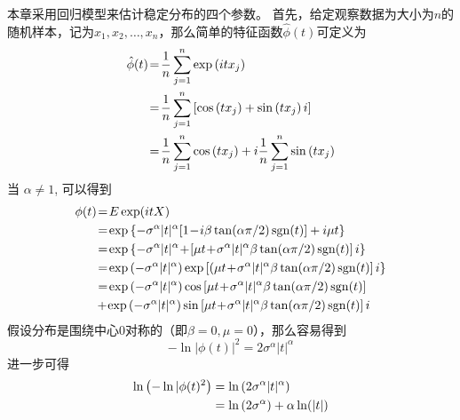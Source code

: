 本章采用回归模型来估计稳定分布的四个参数。
首先，给定观察数据为大小为$n$的随机样本，记为$x_1, x_2, \ldots, x_n$，那么简单的特征函数$\hat{\phi}(t)$可定义为
\begin{align}
	\hat{\phi}(t)&\!=\!\frac{1}{n} \sum_{j=1}^{n} \exp \left(i t x_{j}\right) \notag \\
	&\!=\!\frac{1}{n} \sum_{j=1}^{n}\left[\cos \left(t x_{j}\right)+\sin \left(t x_{j}\right) i\right] \notag \\
	&\!=\!\frac{1}{n} \sum_{j=1}^{n} \cos \left(t x_{j}\right)+i \frac{1}{n} \sum_{j=1}^{n} \sin \left(t x_{j}\right)
\end{align}
当 $\alpha \neq 1$, 可以得到
\begin{align}
	\phi(t) 
	&\!=\!E \exp (i t X) \notag \\ 
	&\!=\!\exp \left\{-\sigma^{\alpha}|t|^{\alpha}[1\!-\!i \beta \tan (\alpha \pi / 2) \operatorname{sgn}(t)]+i \mu t\right\} \notag \\ 
	&\!=\!\exp \left\{-\sigma^{\alpha}|t|^{\alpha}\!+\!\left[\mu t\!+\!\sigma^{\alpha}|t|^{\alpha} \beta \tan (\alpha \pi / 2) \operatorname{sgn}(t)\right] i\right\} \notag \\  
	&\!=\!\exp \left(-\sigma^{\alpha}|t|^{\alpha}\right) \exp \left[\left(\mu t\!+\!\sigma^{\alpha}|t|^{\alpha} \beta \tan (\alpha \pi / 2) \operatorname{sgn}(t)\right] i\right\} \notag \\ 
	&\!=\!\exp \left(-\sigma^{\alpha}|t|^{\alpha}\right) \cos \left[\mu t\!+\!\sigma^{\alpha}|t|^{\alpha} \beta \tan (\alpha \pi / 2) \operatorname{sgn}(t)\right] \notag \\ 
	&\!+\!\exp \left(-\sigma^{\alpha}|t|^{\alpha}\right) \sin \left[\mu t\!+\!\sigma^{\alpha}|t|^{\alpha} \beta \tan (\alpha \pi / 2) \operatorname{sgn}(t)\right] i 
\label{equ 6-5}
\end{align}
假设分布是围绕中心$0$对称的（即$\beta = 0, \mu = 0$），那么容易得到
\begin{equation}
	-\ln |\phi(t)|^{2}=2 \sigma^{\alpha}|t|^{\alpha}
\end{equation}
进一步可得
\begin{align} 
	\ln \left(-\ln | \phi(t)^{2}\right)
	&= \ln \left(2 \sigma^{\alpha}|t|^{\alpha}\right) \notag \\ 
	&=\ln \left(2 \sigma^{\alpha}\right)+\alpha \ln (|t|) 
\end{align}


